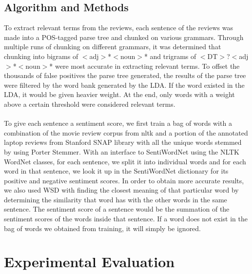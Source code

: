 \documentclass{article}
\begin{document}
\subsection{Algorithm and Methods}
To extract relevant terms from the reviews, each sentence of the reviews was made into a POS-tagged parse tree and chunked on various grammars. Through multiple runs of chunking on different grammars, it was determined that chunking into bigrams of $<$adj$>$*$<$noun$>$* and trigrams of $<$DT$>$?$<$adj$>$*$<$noun$>$* were most accurate in extracting relevant terms. To offset the thousands of false positives the parse tree generated, the results of the parse tree were filtered by the word bank generated by the LDA. If the word existed in the LDA, it would be given heavier weight. At the end, only words with a weight above a certain threshold were considered relevant terms. \\\\
To give each sentence a sentiment score, we first train a bag of words with a combination of the movie review corpus from nltk and a portion of the annotated laptop reviews from Stanford SNAP library with all the unique words stemmed by using Porter Stemmer. With an interface to SentiWordNet using the NLTK WordNet classes, for each sentence, we split it into individual words and for each word in that sentence, we look it up in the SentiWordNet dictionary for its positive and negative sentiment scores. In order to obtain more accurate results, we also used WSD with finding the closest meaning of that particular word by determining the similarity that word has with the other words in the same sentence.  The sentiment score of a sentence would be the summation of the sentiment scores of the words inside that sentence. If a word does not exist in the bag of words we obtained from training, it will simply be ignored.


\section{Experimental Evaluation} 
\end{document}
